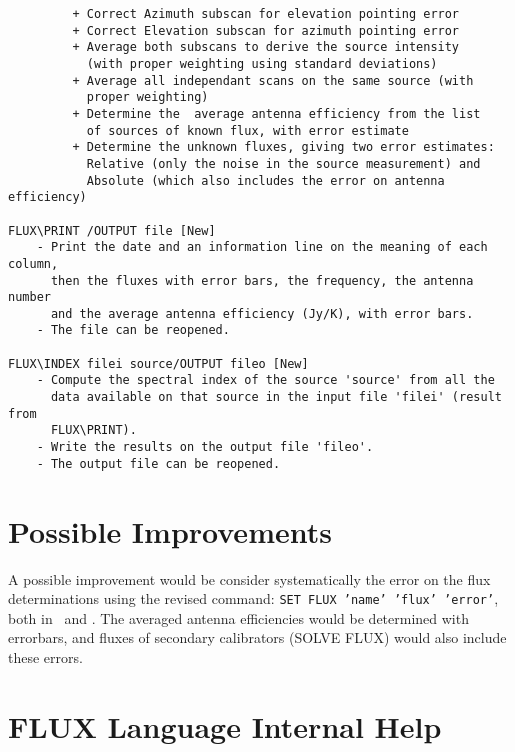 \documentclass[11pt]{article}
\begin{document}
\begin{verbatim}
         + Correct Azimuth subscan for elevation pointing error
         + Correct Elevation subscan for azimuth pointing error
         + Average both subscans to derive the source intensity 
           (with proper weighting using standard deviations)
         + Average all independant scans on the same source (with 
           proper weighting)
         + Determine the  average antenna efficiency from the list 
           of sources of known flux, with error estimate
         + Determine the unknown fluxes, giving two error estimates:
           Relative (only the noise in the source measurement) and 
           Absolute (which also includes the error on antenna efficiency)

FLUX\PRINT /OUTPUT file [New]
    - Print the date and an information line on the meaning of each column,
      then the fluxes with error bars, the frequency, the antenna number
      and the average antenna efficiency (Jy/K), with error bars.
    - The file can be reopened.
 
FLUX\INDEX filei source/OUTPUT fileo [New]
    - Compute the spectral index of the source 'source' from all the
      data available on that source in the input file 'filei' (result from 
      FLUX\PRINT).
    - Write the results on the output file 'fileo'.
    - The output file can be reopened.

\end{verbatim}

\section{Possible Improvements}

A possible improvement would be consider systematically the error on the
flux determinations using the revised command: {\tt SET FLUX 'name' 'flux'
  'error'}, both in \astro\ and \clic.  The averaged antenna efficiencies
would be determined with errorbars, and fluxes of secondary calibrators
(SOLVE FLUX) would also include these errors.

\section{FLUX Language Internal Help}


\newpage \printindex{}
\end{document}
